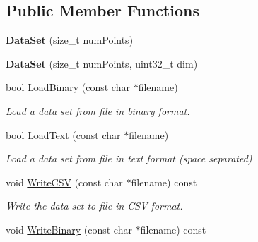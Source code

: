 \subsection*{Public Member Functions}
\begin{DoxyCompactItemize}
\item 
\hypertarget{struct_d_r_d_s_p_1_1_data_set_a6f0c11d360c6e00083f674b04fbd0986}{{\bfseries Data\-Set} (size\-\_\-t num\-Points)}\label{struct_d_r_d_s_p_1_1_data_set_a6f0c11d360c6e00083f674b04fbd0986}

\item 
\hypertarget{struct_d_r_d_s_p_1_1_data_set_ab1fec22ab532a161837090408b0cfd8c}{{\bfseries Data\-Set} (size\-\_\-t num\-Points, uint32\-\_\-t dim)}\label{struct_d_r_d_s_p_1_1_data_set_ab1fec22ab532a161837090408b0cfd8c}

\item 
\hypertarget{struct_d_r_d_s_p_1_1_data_set_a0ffb95866863d3b2bad35b0c68c6c7f3}{bool \hyperlink{struct_d_r_d_s_p_1_1_data_set_a0ffb95866863d3b2bad35b0c68c6c7f3}{Load\-Binary} (const char $\ast$filename)}\label{struct_d_r_d_s_p_1_1_data_set_a0ffb95866863d3b2bad35b0c68c6c7f3}

\begin{DoxyCompactList}\small\item\em Load a data set from file in binary format. \end{DoxyCompactList}\item 
\hypertarget{struct_d_r_d_s_p_1_1_data_set_a9caf2a2c685f1433028de6d3c11bd758}{bool \hyperlink{struct_d_r_d_s_p_1_1_data_set_a9caf2a2c685f1433028de6d3c11bd758}{Load\-Text} (const char $\ast$filename)}\label{struct_d_r_d_s_p_1_1_data_set_a9caf2a2c685f1433028de6d3c11bd758}

\begin{DoxyCompactList}\small\item\em Load a data set from file in text format (space separated) \end{DoxyCompactList}\item 
\hypertarget{struct_d_r_d_s_p_1_1_data_set_a1d90f86c1fbe0380d91158b1c050c501}{void \hyperlink{struct_d_r_d_s_p_1_1_data_set_a1d90f86c1fbe0380d91158b1c050c501}{Write\-C\-S\-V} (const char $\ast$filename) const }\label{struct_d_r_d_s_p_1_1_data_set_a1d90f86c1fbe0380d91158b1c050c501}

\begin{DoxyCompactList}\small\item\em Write the data set to file in C\-S\-V format. \end{DoxyCompactList}\item 
\hypertarget{struct_d_r_d_s_p_1_1_data_set_a3003901476d4b92d122a64d78d67e212}{void \hyperlink{struct_d_r_d_s_p_1_1_data_set_a3003901476d4b92d122a64d78d67e212}{Write\-Binary} (const char $\ast$filename) const }\label{struct_d_r_d_s_p_1_1_data_set_a3003901476d4b92d122a64d78d67e212}


\end{DoxyCompactItemize}
